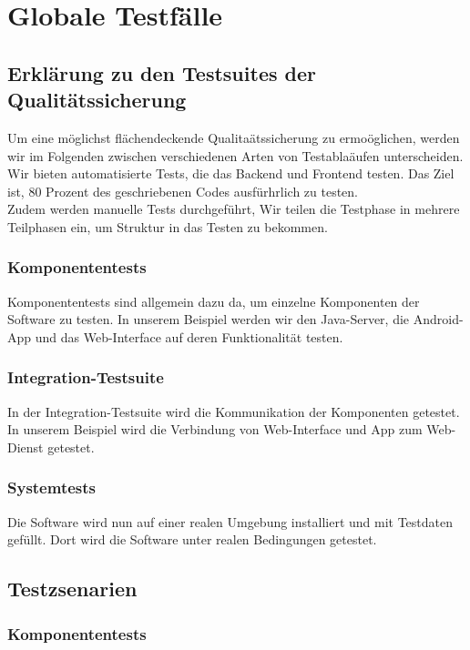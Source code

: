 \chapter{Globale Testf\"alle}
\section{Erkl\"arung zu den Testsuites der Qualit\"atssicherung}
Um eine m\"oglichst fl\"achendeckende Qualita\"atssicherung zu ermo\"oglichen, werden wir im Folgenden zwischen verschiedenen Arten von Testabla\"aufen unterscheiden. Wir bieten automatisierte Tests, die das Backend und Frontend testen. Das Ziel ist, 80 Prozent des geschriebenen Codes ausf\"urhrlich zu testen. \\
Zudem werden manuelle Tests durchgef\"uhrt, 
Wir teilen die Testphase in mehrere Teilphasen ein, um Struktur in das Testen zu bekommen.
\subsection{Komponententests}
Komponententests sind allgemein dazu da, um einzelne Komponenten der Software zu testen. In unserem Beispiel werden wir den Java-Server, die \gls{Android}-\gls{App} und das \gls{Web-Interface} auf deren Funktionalit\"at testen. 
\subsection{Integration-Testsuite}
In der Integration-Testsuite wird die Kommunikation der Komponenten getestet. In unserem Beispiel wird die Verbindung von \gls{Web-Interface} und \gls{App} zum \gls{Web-Dienst} getestet.
\subsection{Systemtests}
Die Software wird nun auf einer realen Umgebung installiert und mit Testdaten gef\"ullt. Dort wird die Software unter realen Bedingungen getestet.

\section{Testzsenarien}
\subsection{Komponententests}

